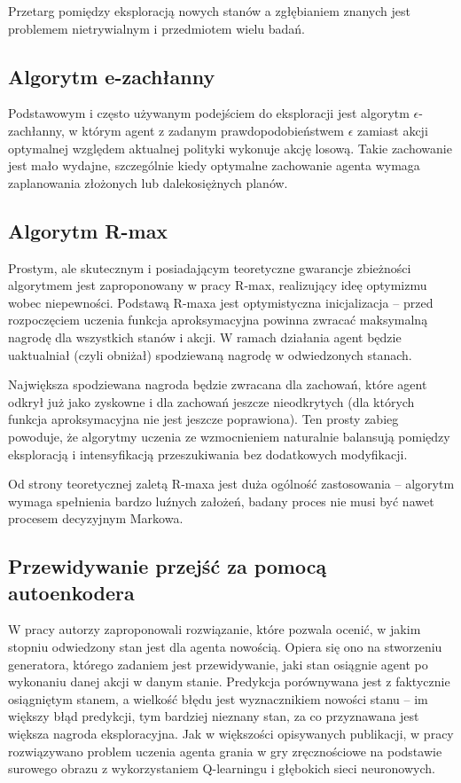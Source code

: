 \documentclass[polish,master,a4paper,oneside]{ppfcmthesis}
\begin{document}
Przetarg pomiędzy eksploracją nowych stanów a zgłębianiem znanych jest problemem nietrywialnym i przedmiotem wielu badań.

\subsection{Algorytm e-zachłanny}\label{egreedy}
Podstawowym i często używanym podejściem do eksploracji jest algorytm $\epsilon$-zachłanny, w którym agent z zadanym prawdopodobieństwem $\epsilon$ zamiast akcji optymalnej względem aktualnej polityki wykonuje akcję losową. Takie zachowanie jest mało wydajne, szczególnie kiedy optymalne zachowanie agenta wymaga zaplanowania złożonych lub dalekosiężnych planów.

\subsection{Algorytm R-max}
Prostym, ale skutecznym i posiadającym teoretyczne gwarancje zbieżności algorytmem jest zaproponowany w pracy \cite{brafman02} R-max, realizujący ideę optymizmu wobec niepewności. Podstawą R-maxa jest optymistyczna inicjalizacja – przed rozpoczęciem uczenia funkcja aproksymacyjna powinna zwracać maksymalną nagrodę dla wszystkich stanów i akcji. W ramach działania agent będzie uaktualniał (czyli obniżał) spodziewaną nagrodę w odwiedzonych stanach.

Największa spodziewana nagroda będzie zwracana dla zachowań, które agent odkrył już jako zyskowne i dla zachowań jeszcze nieodkrytych (dla których funkcja aproksymacyjna nie jest jeszcze poprawiona). Ten prosty zabieg powoduje, że algorytmy uczenia ze wzmocnieniem naturalnie balansują pomiędzy eksploracją i intensyfikacją przeszukiwania bez dodatkowych modyfikacji.

Od strony teoretycznej zaletą R-maxa jest duża ogólność zastosowania – algorytm wymaga spełnienia bardzo luźnych założeń, badany proces nie musi być nawet procesem decyzyjnym Markowa.

\subsection{Przewidywanie przejść za pomocą autoenkodera}
W pracy \cite{DBLP:journals/corr/StadieLA15} autorzy zaproponowali rozwiązanie, które pozwala ocenić, w jakim stopniu odwiedzony stan jest dla agenta nowością. Opiera się ono na stworzeniu generatora, którego zadaniem jest przewidywanie, jaki stan osiągnie agent po wykonaniu danej akcji w danym stanie. Predykcja porównywana jest z faktycznie osiągniętym stanem, a wielkość błędu jest wyznacznikiem nowości stanu – im większy błąd predykcji, tym bardziej nieznany stan, za co przyznawana jest większa nagroda eksploracyjna. Jak w większości opisywanych publikacji, w pracy \cite{DBLP:journals/corr/StadieLA15} rozwiązywano problem uczenia agenta grania w gry zręcznościowe na podstawie surowego obrazu z wykorzystaniem Q-learningu i głębokich sieci neuronowych.
\end{document}
